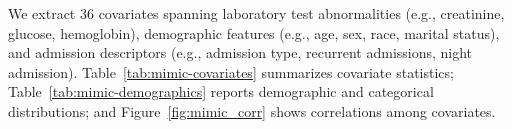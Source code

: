 \documentclass{article} %
\begin{document}
We extract 36 covariates spanning laboratory test abnormalities (e.g., creatinine, glucose, hemoglobin), demographic features (e.g., age, sex, race, marital status), and admission descriptors (e.g., admission type, recurrent admissions, night admission). Table~\ref{tab:mimic-covariates} summarizes covariate statistics; Table~\ref{tab:mimic-demographics} reports demographic and categorical distributions; and Figure~\ref{fig:mimic_corr} shows correlations among covariates.

\end{document}
